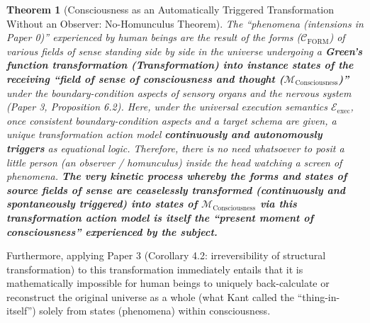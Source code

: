\documentclass[11pt,a4paper]{article}
\theoremstyle{definition}
\theoremstyle{plain}
\newtheorem{theorem}{Theorem}[section]
\begin{document}
\begin{theorem}[Consciousness as an Automatically Triggered Transformation Without an Observer: No-Homunculus Theorem]
The ``phenomena (intensions in Paper 0)'' experienced by human beings are the result of the forms ($\mathcal{C}_{\mathrm{FORM}}$) of various fields of sense standing side by side in the universe undergoing a \textbf{Green's function transformation (Transformation) into instance states of the receiving ``field of sense of consciousness and thought ($\mathcal{M}_{\mathrm{Consciousness}}$)''} under the boundary-condition aspects of sensory organs and the nervous system (Paper 3, Proposition 6.2). Here, under the universal execution semantics $\mathcal{E}_{\mathrm{exec}}$, once consistent boundary-condition aspects and a target schema are given, a unique transformation action model \textbf{continuously and autonomously triggers} as equational logic. Therefore, there is no need whatsoever to posit a little person (an observer / homunculus) inside the head watching a screen of phenomena. \textbf{The very kinetic process whereby the forms and states of source fields of sense are ceaselessly transformed (continuously and spontaneously triggered) into states of $\mathcal{M}_{\mathrm{Consciousness}}$ via this transformation action model is itself the ``present moment of consciousness'' experienced by the subject.}
\end{theorem}

Furthermore, applying Paper 3 (Corollary 4.2: irreversibility of structural transformation) to this transformation immediately entails that it is mathematically impossible for human beings to uniquely back-calculate or reconstruct the original universe as a whole (what Kant called the ``thing-in-itself'') solely from states (phenomena) within consciousness.
\end{document}
